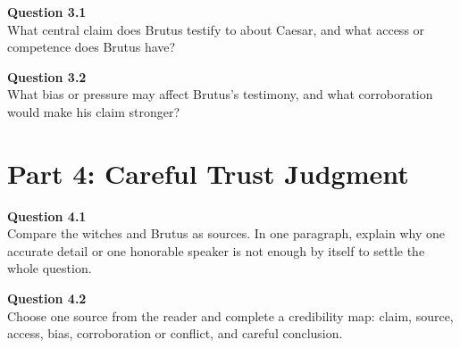 \documentclass[12pt]{article}
\begin{document}
\textbf{Question 3.1}\\[-0.15em]
What central claim does Brutus testify to about Caesar, and what access or competence does Brutus have?


\textbf{Question 3.2}\\[-0.15em]
What bias or pressure may affect Brutus's testimony, and what corroboration would make his claim stronger?


\newpage

\section*{Part 4: Careful Trust Judgment}

\textbf{Question 4.1}\\[-0.15em]
Compare the witches and Brutus as sources. In one paragraph, explain why one accurate detail or one honorable speaker is not enough by itself to settle the whole question.


\textbf{Question 4.2}\\[-0.15em]
Choose one source from the reader and complete a credibility map: claim, source, access, bias, corroboration or conflict, and careful conclusion.

\end{document}
